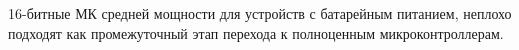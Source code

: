 \label{msp}

16-битные МК средней мощности для устройств с батарейным питанием, неплохо
подходят как промежуточный этап перехода к полноценным микроконтроллерам.
